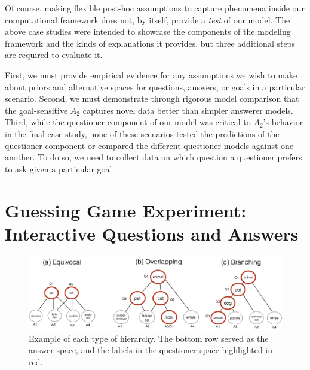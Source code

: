 \documentclass[12pt, floatsintext, jou]{apa6}
\begin{document}

Of course, making flexible post-hoc assumptions to capture phenomena inside our computational framework does not, by itself, provide a \emph{test} of our model. The above case studies were intended to showcase the components of the modeling framework and the kinds of explanations it provides, but three additional steps are required to evaluate it. 

First, we must provide empirical evidence for any assumptions we wish to make about priors and alternative spaces for questions, answers, or goals in a particular scenario. 
Second, we must demonstrate through rigorous model comparison that the goal-sensitive $A_2$ captures novel data better than simpler answerer models. 
Third, while the questioner component of our model was critical to $A_2$'s behavior in the final case study, none of these scenarios tested the predictions of the questioner component or compared the different questioner models against one another. To do so, we need to collect data on which question a questioner prefers to ask given a particular goal. 

\section{Guessing Game Experiment: \\Interactive Questions and Answers}

\begin{figure}[t!]
\begin{center}
\includegraphics[scale = .3]{hierarchyStructureExamples.png}
\end{center}
\caption{Example of each type of hierarchy. The bottom row served as the answer space, and the labels in the questioner space highlighted in red.}
\label{fig:hierarchyStructures}
\end{figure}
\end{document}
